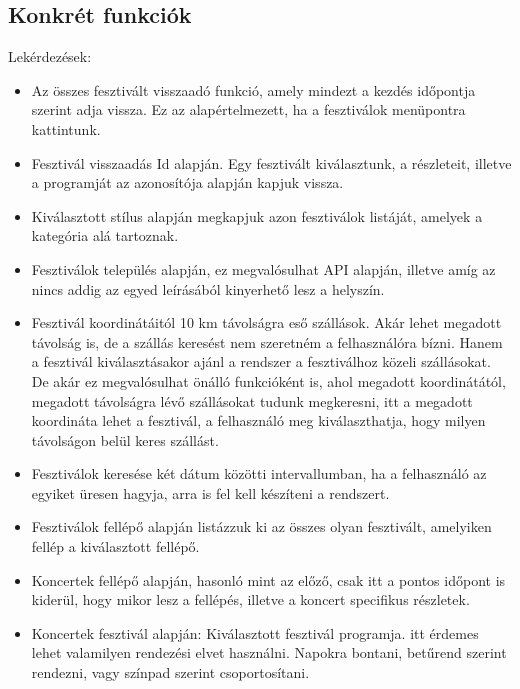 \subsection{Konkrét funkciók}

Lekérdezések: %
\begin{itemize}
\item Az összes fesztivált visszaadó funkció, amely mindezt a kezdés időpontja szerint adja vissza. Ez az alapértelmezett, ha a fesztiválok menüpontra kattintunk.
\item Fesztivál visszaadás Id alapján. Egy fesztivált kiválasztunk, a részleteit, illetve a programját az azonosítója alapján kapjuk vissza. 
\item Kiválasztott stílus alapján megkapjuk azon fesztiválok listáját, amelyek a kategória alá tartoznak.
\item Fesztiválok település alapján, ez megvalósulhat API alapján, illetve amíg az nincs addig az egyed leírásából kinyerhető lesz a helyszín. 
\item Fesztivál koordinátáitól 10 km távolságra eső szállások. Akár lehet megadott távolság is, de a szállás keresést nem szeretném a felhasználóra bízni. Hanem a fesztivál kiválasztásakor ajánl a rendszer a fesztiválhoz közeli szállásokat. De akár ez megvalósulhat önálló funkcióként is, ahol megadott koordinátától, megadott távolságra lévő szállásokat tudunk megkeresni, itt a megadott koordináta lehet a fesztivál, a felhasználó meg kiválaszthatja, hogy milyen távolságon belül keres szállást.
\item Fesztiválok keresése két dátum közötti intervallumban, ha a felhasználó az egyiket üresen hagyja, arra is fel kell készíteni a rendszert.
\item Fesztiválok fellépő alapján listázzuk ki az összes olyan fesztivált, amelyiken fellép a kiválasztott fellépő.
\item Koncertek fellépő alapján, hasonló mint az előző, csak itt a pontos időpont is kiderül, hogy mikor lesz a fellépés, illetve a koncert specifikus részletek. %
\item Koncertek fesztivál alapján:  Kiválasztott fesztivál programja. itt érdemes lehet valamilyen rendezési elvet használni. Napokra bontani, betűrend szerint rendezni, vagy színpad szerint csoportosítani. %

\end{itemize}
